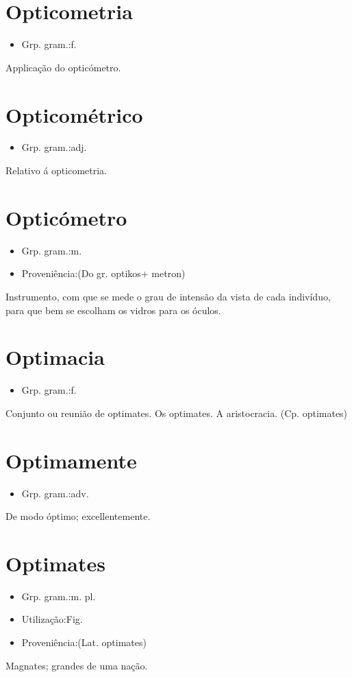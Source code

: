\section{Opticometria}
\begin{itemize}
\item {Grp. gram.:f.}
\end{itemize}
Applicação do opticómetro.
\section{Opticométrico}
\begin{itemize}
\item {Grp. gram.:adj.}
\end{itemize}
Relativo á opticometria.
\section{Opticómetro}
\begin{itemize}
\item {Grp. gram.:m.}
\end{itemize}
\begin{itemize}
\item {Proveniência:(Do gr. \textunderscore optikos\textunderscore  + \textunderscore metron\textunderscore )}
\end{itemize}
Instrumento, com que se mede o grau de intensão da vista de cada indivíduo, para que bem se escolham os vidros para os óculos.
\section{Optimacia}
\begin{itemize}
\item {Grp. gram.:f.}
\end{itemize}
Conjunto ou reunião de optimates.
Os optimates.
A aristocracia.
(Cp. \textunderscore optimates\textunderscore )
\section{Optimamente}
\begin{itemize}
\item {Grp. gram.:adv.}
\end{itemize}
De modo óptimo; excellentemente.
\section{Optimates}
\begin{itemize}
\item {Grp. gram.:m. pl.}
\end{itemize}
\begin{itemize}
\item {Utilização:Fig.}
\end{itemize}
\begin{itemize}
\item {Proveniência:(Lat. \textunderscore optimates\textunderscore )}
\end{itemize}
Magnates; grandes de uma nação.
